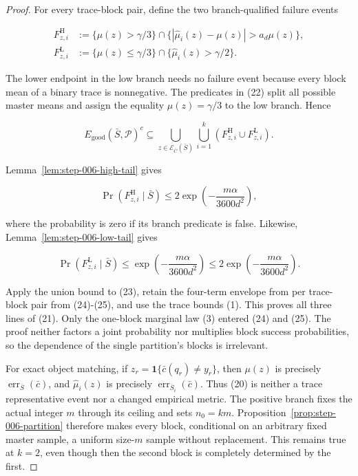 \begin{proof}
For every trace-block pair, define the two branch-qualified
failure events

\[
\begin{aligned}
 F^{\mathrm H}_{z,i}
 &:=\{\mu(z)>\gamma/3\}
   \cap\{|\widehat\mu_i(z)-\mu(z)|>a_d\mu(z)\},\\
 F^{\mathrm L}_{z,i}
 &:=\{\mu(z)\leq\gamma/3\}
   \cap\{\widehat\mu_i(z)>\gamma/2\}.
\end{aligned}
\tag{22}
\]

The lower endpoint in the low branch needs no failure event because every
block mean of a binary trace is nonnegative.  The predicates in (22) split
all possible master means and assign the equality
\(\mu(z)=\gamma/3\) to the low branch.  Hence

\[
 E_{\mathrm{good}}(\bar S,\mathcal P)^c
 \subseteq
 \bigcup_{z\in\mathcal E_{\bar C}(\bar S)}
 \bigcup_{i=1}^k
 \left(F^{\mathrm H}_{z,i}\cup F^{\mathrm L}_{z,i}\right).
\tag{23}
\]

Lemma~\ref{lem:step-006-high-tail} gives

\[
 \Pr(F^{\mathrm H}_{z,i}\mid\bar S)
 \leq2\exp\!\left(-\frac{m\alpha}{3600d^2}\right),
\tag{24}
\]

where the probability is zero if its branch predicate is false.  Likewise,
Lemma~\ref{lem:step-006-low-tail} gives

\[
 \Pr(F^{\mathrm L}_{z,i}\mid\bar S)
 \leq\exp\!\left(-\frac{m\alpha}{3600d^2}\right)
 \leq2\exp\!\left(-\frac{m\alpha}{3600d^2}\right).
\tag{25}
\]

Apply the union bound to (23), retain the four-term envelope from
per trace-block pair from (24)-(25), and use the  trace bounds (1).
This proves all three lines of (21).  Only the one-block marginal law (3)
entered (24) and (25).  The proof neither factors a joint probability nor
multiplies block success probabilities, so the dependence of the single
partition's blocks is irrelevant.

For exact object matching, if
\(z_r=\mathbf1\{\bar c(q_r)\ne y_r\}\), then \(\mu(z)\) is precisely
\(\operatorname{err}_{\bar S}(\bar c)\), and
\(\widehat\mu_i(z)\) is precisely
\(\operatorname{err}_{\bar S_i}(\bar c)\).  Thus (20) is neither a trace
representative event nor a changed empirical metric. 
The positive branch fixes the actual integer \(m\) through its ceiling and
sets \(n_0=km\).  Proposition~\ref{prop:step-006-partition} therefore makes
every block, conditional on an arbitrary fixed master sample, a uniform
size-\(m\) sample without replacement.  This remains true at \(k=2\), even
though then the second block is completely determined by the first.


\end{proof}
